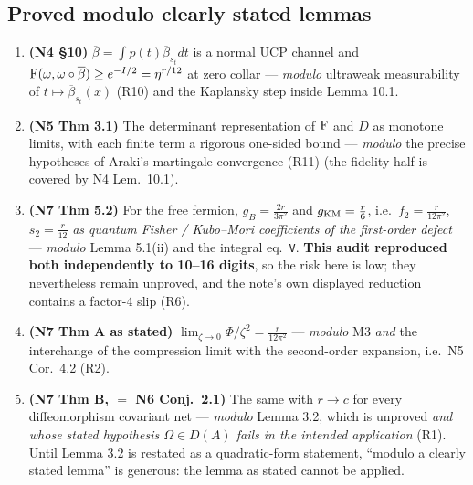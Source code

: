 \documentclass[11pt]{article}
\newcommand{\NIV}{N4}\newcommand{\NV}{N5}\newcommand{\NVI}{N6}\newcommand{\NVII}{N7}
\newcommand{\CMI}{I}
\newcommand{\zz}{\zeta}
\begin{document}
\subsection{Proved modulo clearly stated lemmas}
\begin{enumerate}[leftmargin=1.7em]
\item[M1.] \textbf{(\NIV{} \S10)} $\overline\beta=\int p(t)\overline\beta_{s_t}dt$ is a normal UCP channel and
$\Fid(\omega,\omega\circ\overline\beta)\ge e^{-\CMI/2}=\eta^{r/12}$ at zero collar --- \emph{modulo} ultraweak
measurability of $t\mapsto\overline\beta_{s_t}(x)$ (R10) and the Kaplansky step inside Lemma 10.1.
\item[M2.] \textbf{(\NV{} Thm 3.1)} The determinant representation of $\operatorname{F}$ and $D$ as monotone limits, with each
finite term a rigorous one-sided bound --- \emph{modulo} the precise hypotheses of Araki's martingale convergence
(R11) (the fidelity half is covered by \NIV{} Lem.~10.1).
\item[M3.] \textbf{(\NVII{} Thm 5.2)} For the free fermion, $g_B=\frac{2r}{3\pi^2}$ and $g_{\rm KM}=\frac r6$, i.e.\
$f_2=\frac r{12\pi^2}$, $s_2=\frac r{12}$ \emph{as quantum Fisher / Kubo--Mori coefficients of the first-order defect}
--- \emph{modulo} Lemma 5.1(ii) and the integral eq.~\texttt{V}.
\textbf{This audit reproduced both independently to 10--16 digits}, so the risk here is low; they nevertheless remain
unproved, and the note's own displayed reduction contains a factor-4 slip (R6).
\item[M4.] \textbf{(\NVII{} Thm A as stated)} $\lim_{\zz\to0}\Phi/\zz^2=\frac r{12\pi^2}$ --- \emph{modulo} M3
\emph{and} the interchange of the compression limit with the second-order expansion, i.e.\ \NV{} Cor.~4.2 (R2).
\item[M5.] \textbf{(\NVII{} Thm B, $=$ \NVI{} Conj.~2.1)} The same with $r\to c$ for every diffeomorphism covariant net
--- \emph{modulo} Lemma 3.2, which is unproved \emph{and whose stated hypothesis $\Omega\in D(A)$ fails in the intended
application} (R1).  Until Lemma 3.2 is restated as a quadratic-form statement, ``modulo a clearly stated lemma'' is
generous: the lemma as stated cannot be applied.
\end{enumerate}
\end{document}
